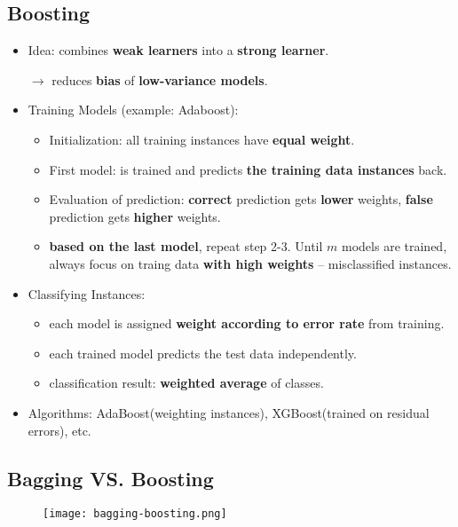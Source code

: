 \subsection{Boosting}
\begin{itemize}
	\item Idea: combines \textbf{weak learners} into a \textbf{strong learner}. 
	
	$\rightarrow$ reduces \textbf{bias} of \textbf{low-variance models}.
	\item Training Models (example: Adaboost):
	\begin{itemize}
		\item Initialization: all training instances have \textbf{equal weight}.
		\item First model:  is trained and predicts \textbf{the training data instances} back.
		\item Evaluation of prediction: \textbf{correct} prediction gets \textbf{lower} weights, \textbf{false} prediction gets \textbf{higher} weights.
		\item \textbf{based on the last model}, repeat step 2-3. Until $m$ models are trained, always focus on traing data \textbf{with high weights} -- misclassified instances. 
	\end{itemize}
	\item Classifying Instances: 
	\begin{itemize}
		\item each model is assigned \textbf{weight according to error rate} from training.
		\item each trained model predicts the test data independently.
		\item classification result: \textbf{weighted average} of classes.
	\end{itemize}
	\item Algorithms: AdaBoost(weighting instances), XGBoost(trained on residual errors), etc.
\end{itemize}

\subsection{Bagging VS. Boosting}
\begin{figure}[H]
	\centering
	\texttt{[image: bagging-boosting.png]}
\end{figure}
